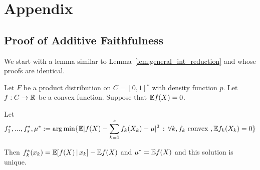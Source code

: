 \section*{Appendix}

\subsection{Proof of Additive Faithfulness}
\label{sec:faithful_proof}

We start with a lemma similar to Lemma~\ref{lem:general_int_reduction} and whose proofs are identical.

\begin{lemma}
\label{lem:int_reduction}
Let $F$ be a product distribution on $C=[0,1]^s$ with density function $p$. Let $f: C \rightarrow {\mathbb R}$ be a convex function. Suppose that ${\mathbb E} f(X) = 0$.

Let $\displaystyle f^*_1,...,f^*_s, \mu^* := \arg\min \{ {\mathbb E} | f(X) - \sum_{k=1}^s f_k(X_k) - \mu |^2 \,:\, \forall k, f_k \textrm{ convex }, {\mathbb E} f_k(X_k) = 0\}$ 

Then $f^*_k(x_k) = {\mathbb E}[ f(X) {\,|\,} x_k] - {\mathbb E} f(X)$ and $\mu^* = {\mathbb E} f(X)$ and this solution is unique.
\end{lemma}
 
